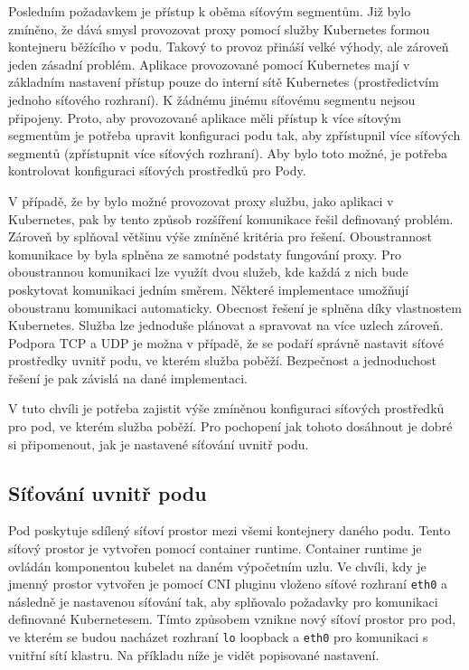 Posledním požadavkem je přístup k oběma síťovým segmentům. Již bylo zmíněno, že dává smysl provozovat proxy pomocí služby Kubernetes formou kontejneru běžícího v podu. Takový to provoz přináší velké výhody, ale zároveň jeden zásadní problém. Aplikace provozované pomocí Kubernetes mají v základním nastavení přístup pouze do interní sítě Kubernetes (prostředictvím jednoho síťového rozhraní). K žádnému jinému  síťovému segmentu nejsou připojeny. Proto, aby provozované aplikace měli přístup k více sítovým segmentům je potřeba upravit konfiguraci podu tak, aby zpřístupnil více síťových segmentů (zpřístupnit více síťových rozhraní). Aby bylo toto možné, je potřeba kontrolovat konfiguraci síťových prostředků pro Pody.

V případě, že by bylo možné provozovat proxy službu, jako aplikaci v Kubernetes, pak by tento způsob rozšíření komunikace řešil definovaný problém. Zároveň by splňoval většinu výše zmíněné kritéria pro řešení. Oboustrannost komunikace by byla splněna ze samotné podstaty fungování proxy. Pro oboustrannou komunikaci lze využít dvou služeb, kde každá z nich bude poskytovat komunikaci jedním směrem. Některé implementace umožňují oboustranu komunikaci automaticky. Obecnost řešení je splněna díky vlastnostem Kubernetes. Služba lze jednoduše plánovat a spravovat na více uzlech zároveň. Podpora TCP a UDP je možna v případě, že se podaří správně nastavit síťové prostředky uvnitř podu, ve kterém služba poběží. Bezpečnost a jednoduchost řešení je pak závislá na dané implementaci.

V tuto chvíli je potřeba zajistit výše zmíněnou konfiguraci síťových prostředků pro pod, ve kterém služba poběží. Pro pochopení jak tohoto dosáhnout je dobré si připomenout, jak je nastavené síťování uvnitř podu.

\subsection{Síťování uvnitř podu}
Pod poskytuje sdílený síťoví prostor mezi všemi kontejnery daného podu. Tento síťový prostor je vytvořen pomocí container runtime. Container runtime je ovládán komponentou kubelet na daném výpočetním uzlu. Ve chvíli, kdy je jmenný prostor vytvořen je pomocí CNI pluginu vloženo síťové rozhraní \verb|eth0| a následně je nastavenou síťování tak, aby splňovalo požadavky pro komunikaci definované Kubernetesem. Tímto způsobem vznikne nový síťoví prostor pro pod, ve kterém se budou nacházet rozhraní \verb|lo| loopback a \verb|eth0| pro komunikaci s vnitřní sítí klastru. Na příkladu níže je vidět popisované nastavení.

